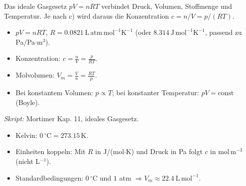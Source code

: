 

Das ideale Gasgesetz $pV = nRT$ verbindet Druck, Volumen, Stoffmenge und
Temperatur. Je nach c) wird daraus die Konzentration $c=n/V=p/(RT)$.

\begin{werkzeugkasten}
\begin{itemize}
  \item $pV = nRT$, $R=0.0821\ \mathrm{L\,atm\,mol^{-1}K^{-1}}$
        (oder $8.314\ \mathrm{J\,mol^{-1}K^{-1}}$, passend zu Pa/Pa$\cdot$m$^3$).
  \item Konzentration: $c = \frac{n}{V} = \frac{p}{RT}$.
  \item Molvolumen: $V_m = \frac{V}{n}=\frac{RT}{p}$.
  \item Bei konstantem Volumen: $p\propto T$; bei konstanter Temperatur:
        $pV = \text{const}$ (Boyle).
\end{itemize}
\textit{Skript:} Mortimer Kap. 11, ideales Gasgesetz.
\end{werkzeugkasten}

\begin{achtung}
\begin{itemize}
  \item Kelvin: $0\,^\circ\mathrm{C} = 273.15\,\mathrm{K}$.
  \item Einheiten koppeln: Mit $R$ in J/(mol$\cdot$K) und Druck in Pa
        folgt $c$ in $\mathrm{mol\,m^{-3}}$ (nicht L$^{-1}$).
  \item Standardbedingungen: $0\,^\circ\mathrm{C}$ und $1$ atm
        $\Rightarrow V_m \approx 22.4\ \mathrm{L\,mol^{-1}}$.
\end{itemize}
\end{achtung}
